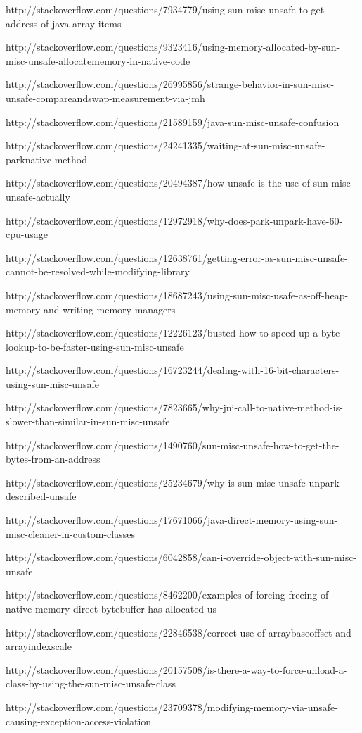 http://stackoverflow.com/questions/7934779/using-sun-misc-unsafe-to-get-address-of-java-array-items

http://stackoverflow.com/questions/9323416/using-memory-allocated-by-sun-misc-unsafe-allocatememory-in-native-code

http://stackoverflow.com/questions/26995856/strange-behavior-in-sun-misc-unsafe-compareandswap-measurement-via-jmh

http://stackoverflow.com/questions/21589159/java-sun-misc-unsafe-confusion

http://stackoverflow.com/questions/24241335/waiting-at-sun-misc-unsafe-parknative-method

http://stackoverflow.com/questions/20494387/how-unsafe-is-the-use-of-sun-misc-unsafe-actually

http://stackoverflow.com/questions/12972918/why-does-park-unpark-have-60-cpu-usage

http://stackoverflow.com/questions/12638761/getting-error-as-sun-misc-unsafe-cannot-be-resolved-while-modifying-library

http://stackoverflow.com/questions/18687243/using-sun-misc-usafe-as-off-heap-memory-and-writing-memory-managers

http://stackoverflow.com/questions/12226123/busted-how-to-speed-up-a-byte-lookup-to-be-faster-using-sun-misc-unsafe

http://stackoverflow.com/questions/16723244/dealing-with-16-bit-characters-using-sun-misc-unsafe

http://stackoverflow.com/questions/7823665/why-jni-call-to-native-method-is-slower-than-similar-in-sun-misc-unsafe

http://stackoverflow.com/questions/1490760/sun-misc-unsafe-how-to-get-the-bytes-from-an-address

http://stackoverflow.com/questions/25234679/why-is-sun-misc-unsafe-unpark-described-unsafe

http://stackoverflow.com/questions/17671066/java-direct-memory-using-sun-misc-cleaner-in-custom-classes

http://stackoverflow.com/questions/6042858/can-i-override-object-with-sun-misc-unsafe

http://stackoverflow.com/questions/8462200/examples-of-forcing-freeing-of-native-memory-direct-bytebuffer-has-allocated-us

http://stackoverflow.com/questions/22846538/correct-use-of-arraybaseoffset-and-arrayindexscale

http://stackoverflow.com/questions/20157508/is-there-a-way-to-force-unload-a-class-by-using-the-sun-misc-unsafe-class

http://stackoverflow.com/questions/23709378/modifying-memory-via-unsafe-causing-exception-access-violation

